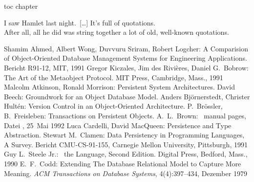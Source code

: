 \begin{thebibliography}{Stonebraker \etal\ 86a}
\addcontentsline%
 {toc}%
 {chapter}%
 {\protect\numberline{}{\protect\bibname}}%
%
\item[]%
\vspace{-\topsep}\hspace{-\leftmargin}%
%
\begin{fortune}[11cm]
{\rglqq}I saw Hamlet last night.\ {[}\ldots{]} It's full of
quotations.{\rgrqq}
\\[\bigskipamount]
After all, all he did was string together a lot of old, well-known
quotations.
\end{fortune}%
%
\vspace{-\itemsep}%
%
Shamim Ahmed, Albert Wong, Duvvuru Sriram, Robert Logcher:
A Comparision of Object-Oriented Database Management Systems for
Engineering Applications.
Bericht R91-12, %
MIT, 1991
%
Gregor Kiczales, Jim des Rivi\`{e}res, Daniel G.\ Bobrow:
The Art of the Metaobject Protocol.
MIT Press, Cambridge, Mass., 1991
%
Malcolm Atkinson, Ronald Morrison:
Persistent System Architectures.
%
David Beech:
Groundwork for an Object Database Model.
%
Anders Bj\"{o}rnerstedt, Christer Hult\'{e}n:
Version Control in an Object-Oriented Architecture.
%
P.\ Br\"{o}ssler, B.\ Freisleben:
Transactions on Persistent Objects.
%
A.\ L.\ Brown:
\sh\ manual pages,
Datei ,
25~Mai 1992
%
Luca Cardelli, David MacQueen:
Persistence and Type Abstraction.
%
Stewart M.\ Clamen:
Data Persistency in Programming Languages, A Survey.
Bericht CMU-CS-91-155,
Carnegie Mellon University, Pittsburgh,
1991
%
Guy L.\ Steele Jr.:
\cl\ the Language, Second Edition.
Digital Press, Bedford, Mass., 1990
%
E.\ F.\ Codd:
Extending The Database Relational Model to Capture More Meaning.
{\em ACM Transactions on Database Systems\/},
4(4):397--434, Dezember 1979
%

\end{thebibliography}
